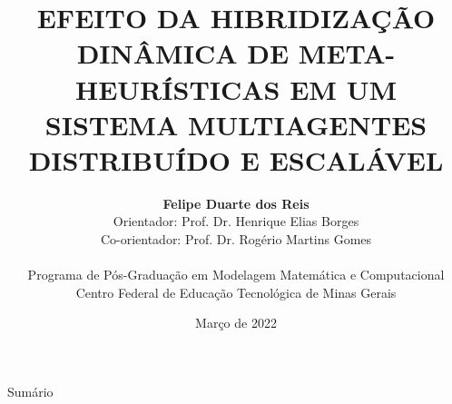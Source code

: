 \documentclass[fleqn,]{beamer}
\title[Mestrado em Modelagem Matemática e Computacional]{EFEITO DA HIBRIDIZAÇÃO DINÂMICA DE META-HEURÍSTICAS EM UM SISTEMA MULTIAGENTES DISTRIBUÍDO E ESCALÁVEL}
\author[Felipe Duarte dos Reis]{\textbf{Felipe Duarte dos Reis}\\ [0.3cm] Orientador: Prof. Dr. Henrique Elias Borges \\
Co-orientador: Prof. Dr. Rogério Martins Gomes \\
[0.1cm]\\
\scriptsize{Programa de Pós-Graduação em Modelagem Matemática e Computacional\\ Centro Federal de Educação Tecnológica de Minas Gerais}}
\date{Março de 2022}
\begin{document}
\begin{frame}
  \titlepage
\end{frame}


\begin{frame}{Sumário}
\scriptsize  \tableofcontents
\end{frame}







\end{document}

